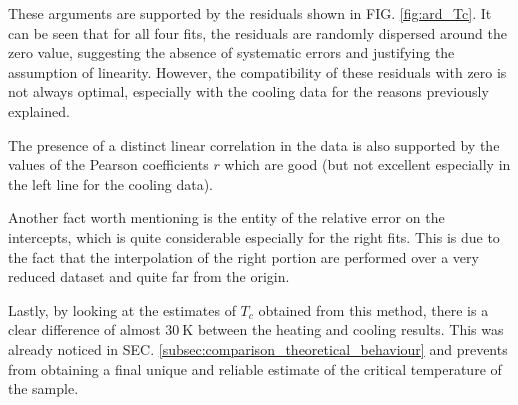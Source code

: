 \documentclass[rmp,10pt,onecolumn,fleqn,notitlepage]{revtex4-1}
\begin{document}
These arguments are supported by the residuals shown in FIG. \ref{fig:ard_Tc}. It can be seen that for all four fits, the residuals are randomly dispersed around the zero value, suggesting the absence of systematic errors and justifying the assumption of linearity. However, the compatibility of these residuals with zero is not always optimal, especially with the cooling data for the reasons previously explained.

The presence of a distinct linear correlation in the data is also supported by the values of the Pearson coefficients $r$ which are good (but not excellent especially in the left line for the cooling data). 

Another fact worth mentioning is the entity of the relative error on the intercepts, which is quite considerable especially for the right fits. This is due to the fact that the interpolation of the right portion are performed over a very reduced dataset and quite far from the origin.

Lastly, by looking at the estimates of $T_{c}$ obtained from this method, there is a clear difference of almost $\SI{30}{\kelvin}$ between the heating and cooling results. This was already noticed in SEC. \ref{subsec:comparison_theoretical_behaviour} and prevents from obtaining a final unique and reliable estimate of the critical temperature of the sample.

\clearpage
\end{document}
